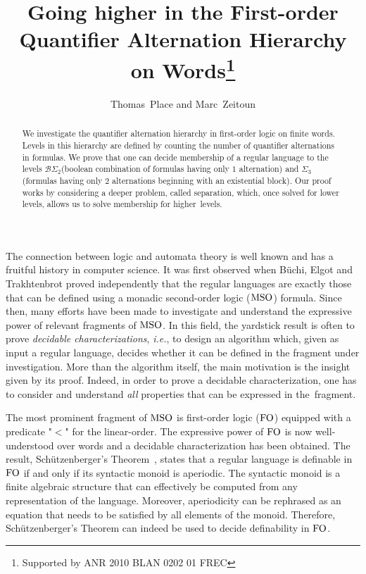 \documentclass[envcountsame]{llncs}
\title{Going higher in the First-order\\ Quantifier Alternation Hierarchy on Words\thanks{Supported by ANR 2010 BLAN 0202 01 FREC}}
\author{Thomas~Place and Marc~Zeitoun}
\institute{LaBRI, Universit\'e de Bordeaux, France}
\newcommand{\bscd}{\ensuremath{\mathcal{B}\Sigma_{2}}\xspace}
\newcommand{\sict}{\ensuremath{\Sigma_{3}}\xspace}
\newcommand{\mso}{\ensuremath{\textup{MSO}}\xspace}
\newcommand{\fo}{\ensuremath{\textup{FO}}\xspace}
\begin{document}
\maketitle

\begin{abstract}
  We investigate the quantifier alternation hierarchy in first-order
  logic on finite words. Levels in this hierarchy are defined by counting the
  number of quantifier alternations in formulas. We prove that one can
  decide membership of a regular language to the levels \bscd (boolean
  combination of formulas having only $1$ alternation) and \sict
  (formulas having only $2$ alternations beginning with an existential
  block). Our proof works by considering a deeper problem, called
  separation, which, once solved for lower levels, allows us to solve
  membership for higher~levels.
\end{abstract}

\label{sec:intro}
The connection between logic and automata theory is well known and has a
fruitful history in computer science. It was first observed when B\"uchi,
Elgot and Trakhtenbrot proved independently that the regular languages are
exactly those that can be defined using a monadic second-order logic (\mso)
formula. Since then, many efforts have been made to investigate and understand
the expressive power of relevant fragments of \mso. In this field, the
yardstick result is often to prove \emph{decidable
  characterizations}, \emph{i.e.}, to design an algorithm which, given as input a
regular language, decides whether it can be defined in the fragment under
investigation. More than the algorithm itself, the main motivation is
the insight given by its proof. Indeed, in order to prove a decidable
characterization, one has to consider and understand \emph{all}
properties that can be expressed in the~fragment.


The most prominent fragment of \mso is first-order logic (\fo)
equipped with a predicate "$<$" for the linear-order. The expressive
power of \fo is now well-understood over words and a decidable
characterization has been obtained. The result, Sch\"utzenberger's
Theorem~\cite{sfo,mnpfo}, states that a regular language is definable
in \fo if and only if its syntactic monoid is aperiodic. The syntactic
monoid is a finite algebraic structure that can effectively be
computed from any representation of the language. Moreover,
aperiodicity can be rephrased as an equation that needs to be
satisfied by all elements of the monoid. Therefore, Sch\"utzenberger's
Theorem can indeed be used to decide definability in \fo.
\end{document}
